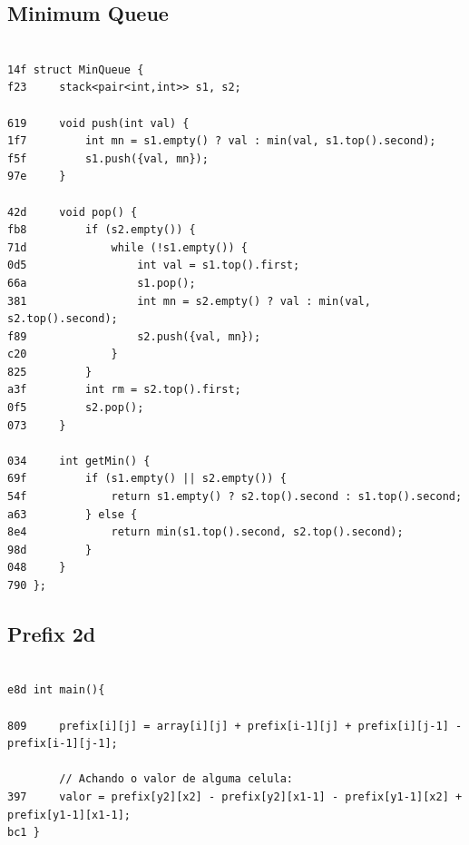 \documentclass[11pt, a4paper, twoside]{article}
\begin{document}
\subsection{Minimum Queue}
\begin{lstlisting}

14f struct MinQueue {
f23     stack<pair<int,int>> s1, s2;
    
619     void push(int val) {
1f7         int mn = s1.empty() ? val : min(val, s1.top().second);
f5f         s1.push({val, mn});
97e     }
    
42d     void pop() {
fb8         if (s2.empty()) {
71d             while (!s1.empty()) {
0d5                 int val = s1.top().first;
66a                 s1.pop();
381                 int mn = s2.empty() ? val : min(val, s2.top().second);
f89                 s2.push({val, mn});
c20             }
825         }
a3f         int rm = s2.top().first;
0f5         s2.pop();
073     }
    
034     int getMin() {
69f         if (s1.empty() || s2.empty()) {
54f             return s1.empty() ? s2.top().second : s1.top().second;
a63         } else {
8e4             return min(s1.top().second, s2.top().second);
98d         }
048     }
790 };
\end{lstlisting}

\subsection{Prefix 2d}
\begin{lstlisting}

e8d int main(){
        
809     prefix[i][j] = array[i][j] + prefix[i-1][j] + prefix[i][j-1] - prefix[i-1][j-1];
        
        // Achando o valor de alguma celula:
397     valor = prefix[y2][x2] - prefix[y2][x1-1] - prefix[y1-1][x2] + prefix[y1-1][x1-1];
bc1 }
\end{lstlisting}
\end{document}
